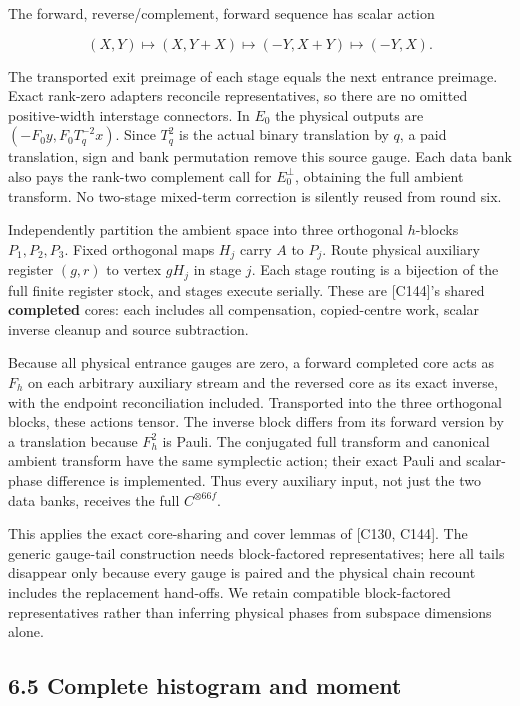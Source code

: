 \documentclass[
  11pt,
]{article}
\begin{document}
The forward, reverse/complement, forward sequence has scalar action

\[
(X,Y)\mapsto(X,Y+X)\mapsto(-Y,X+Y)\mapsto(-Y,X).
\]

The transported exit preimage of each stage equals the next entrance
preimage. Exact rank-zero adapters reconcile representatives, so there
are no omitted positive-width interstage connectors. In \(E_0\) the
physical outputs are \((-F_0y,F_0T_q^{-2}x)\). Since \(T_q^2\) is the
actual binary translation by \(q\), a paid translation, sign and bank
permutation remove this source gauge. Each data bank also pays the
rank-two complement call for \(E_0^\perp\), obtaining the full ambient
transform. No two-stage mixed-term correction is silently reused from
round six.

Independently partition the ambient space into three orthogonal
\(h\)-blocks \(P_1,P_2,P_3\). Fixed orthogonal maps \(H_j\) carry \(A\)
to \(P_j\). Route physical auxiliary register \((g,r)\) to vertex
\(gH_j\) in stage \(j\). Each stage routing is a bijection of the full
finite register stock, and stages execute serially. These are
{[}C144{]}'s shared \textbf{completed} cores: each includes all
compensation, copied-centre work, scalar inverse cleanup and source
subtraction.

Because all physical entrance gauges are zero, a forward completed core
acts as \(F_h\) on each arbitrary auxiliary stream and the reversed core
as its exact inverse, with the endpoint reconciliation included.
Transported into the three orthogonal blocks, these actions tensor. The
inverse block differs from its forward version by a translation because
\(F_h^2\) is Pauli. The conjugated full transform and canonical ambient
transform have the same symplectic action; their exact Pauli and
scalar-phase difference is implemented. Thus every auxiliary input, not
just the two data banks, receives the full \(C^{\otimes66f}\).

This applies the exact core-sharing and cover lemmas of {[}C130,
C144{]}. The generic gauge-tail construction needs block-factored
representatives; here all tails disappear only because every gauge is
paired and the physical chain recount includes the replacement
hand-offs. We retain compatible block-factored representatives rather
than inferring physical phases from subspace dimensions alone.

\subsection{6.5 Complete histogram and
moment}\label{complete-histogram-and-moment}
\end{document}
